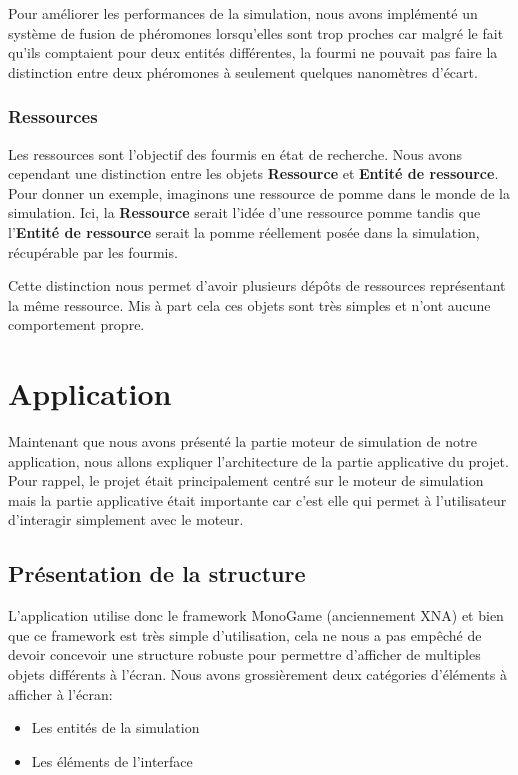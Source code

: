 \documentclass{EPUProjetDi}
\begin{document}
Pour améliorer les performances de la simulation, nous avons implémenté un système de fusion de phéromones lorsqu'elles sont trop proches car malgré 
le fait qu'ils comptaient pour deux entités différentes, la fourmi ne pouvait pas faire la distinction entre deux phéromones à seulement quelques 
nanomètres d'écart.

\subsubsection{Ressources}

Les ressources sont l'objectif des fourmis en état de recherche. Nous avons cependant une distinction entre les objets \textbf{Ressource} et 
\textbf{Entité de ressource}. Pour donner un exemple, imaginons une ressource de pomme dans le monde de la simulation. Ici, la \textbf{Ressource}
serait l'idée d'une ressource pomme tandis que l'\textbf{Entité de ressource} serait la pomme réellement posée dans la simulation, récupérable par 
les fourmis.

Cette distinction nous permet d'avoir plusieurs dépôts de ressources représentant la même ressource. Mis à part cela ces objets sont très simples
et n'ont aucune comportement propre.

\section{Application}

Maintenant que nous avons présenté la partie moteur de simulation de notre application, nous allons expliquer l'architecture de la partie applicative du projet.
Pour rappel, le projet était principalement centré sur le moteur de simulation mais la partie applicative était importante car c'est elle qui permet à l'utilisateur 
d'interagir simplement avec le moteur. 

\subsection{Présentation de la structure}

L'application utilise donc le framework MonoGame (anciennement XNA) et bien que ce framework est très simple d'utilisation, cela ne nous a 
pas empêché de devoir concevoir une structure robuste pour permettre d'afficher de multiples objets différents à l'écran.
Nous avons grossièrement deux catégories d'éléments à afficher à l'écran:
\begin{itemize}
    \item Les entités de la simulation
    \item Les éléments de l'interface
\end{itemize}
\end{document}
